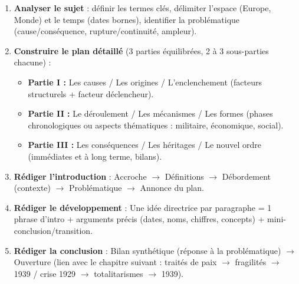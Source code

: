 \documentclass[11pt]{article}
\begin{document}
\begin{methode}
\begin{enumerate}
\item \textbf{Analyser le sujet} : définir les termes clés, délimiter l'espace (Europe, Monde) et le temps (dates bornes), identifier la problématique (cause/conséquence, rupture/continuité, ampleur).
\item \textbf{Construire le plan détaillé} (3 parties équilibrées, 2 à 3 sous-parties chacune) :
\begin{itemize}
\item \textbf{Partie I :} Les causes / Les origines / L'enclenchement (facteurs structurels + facteur déclencheur).
\item \textbf{Partie II :} Le déroulement / Les mécanismes / Les formes (phases chronologiques ou aspects thématiques : militaire, économique, social).
\item \textbf{Partie III :} Les conséquences / Les héritages / Le nouvel ordre (immédiates et à long terme, bilans).
\end{itemize}
\item \textbf{Rédiger l'introduction} : Accroche $\rightarrow$ Définitions $\rightarrow$ Débordement (contexte) $\rightarrow$ Problématique $\rightarrow$ Annonce du plan.
\item \textbf{Rédiger le développement} : Une idée directrice par paragraphe = 1 phrase d'intro + arguments précis (dates, noms, chiffres, concepts) + mini-conclusion/transition.
\item \textbf{Rédiger la conclusion} : Bilan synthétique (réponse à la problématique) $\rightarrow$ Ouverture (lien avec le chapitre suivant : traités de paix $\rightarrow$ fragilités $\rightarrow$ 1939 / crise 1929 $\rightarrow$ totalitarismes $\rightarrow$ 1939).
\end{enumerate}
\end{methode}
\end{document}
